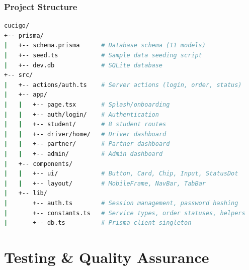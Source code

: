 \documentclass[aspectratio=169,professionalfonts,10pt]{beamer}
\begin{document}
\begin{frame}[fragile]
    \frametitle{Project Structure}

    \begin{lstlisting}[language=bash, caption=\scriptsize Key Directory Layout]
cucigo/
+-- prisma/
|   +-- schema.prisma      # Database schema (11 models)
|   +-- seed.ts            # Sample data seeding script
|   +-- dev.db             # SQLite database
+-- src/
|   +-- actions/auth.ts    # Server actions (login, order, status)
|   +-- app/
|   |   +-- page.tsx       # Splash/onboarding
|   |   +-- auth/login/    # Authentication
|   |   +-- student/       # 8 student routes
|   |   +-- driver/home/   # Driver dashboard
|   |   +-- partner/       # Partner dashboard
|   |   +-- admin/         # Admin dashboard
|   +-- components/
|   |   +-- ui/            # Button, Card, Chip, Input, StatusDot
|   |   +-- layout/        # MobileFrame, NavBar, TabBar
|   +-- lib/
|       +-- auth.ts        # Session management, password hashing
|       +-- constants.ts   # Service types, order statuses, helpers
|       +-- db.ts          # Prisma client singleton
    \end{lstlisting}
\end{frame}

\section{Testing \& Quality Assurance}
\end{document}
